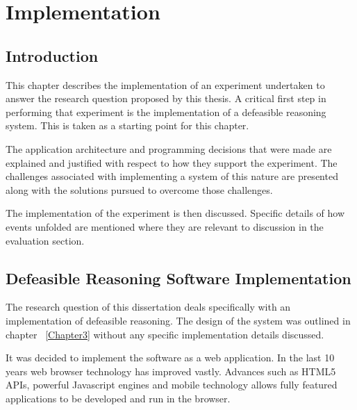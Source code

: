 
\chapter{Implementation} %

\label{Chapter4} %



\section{Introduction}

This chapter describes the implementation of an experiment undertaken to answer the research question proposed by this thesis. A critical first step in performing that experiment is the implementation of a defeasible reasoning system. This is taken as a starting point for this chapter. 

The application architecture and programming decisions that were made are explained and justified with respect to how they support the experiment. The challenges associated with implementing a system of this nature are presented along with the solutions pursued to overcome those challenges.

The implementation of the experiment is then discussed. Specific details of how events unfolded are mentioned where they are relevant to discussion in the evaluation section.

\section{Defeasible Reasoning Software Implementation}

The research question of this dissertation deals specifically with an implementation of defeasible reasoning. The design of the system was outlined in chapter ~\ref{Chapter3} without any specific implementation details discussed. 

It was decided to implement the software as a web application. In the last 10 years web browser technology has improved vastly. Advances such as HTML5 APIs, powerful Javascript engines and mobile technology allows fully featured applications to be developed and run in the browser. 

